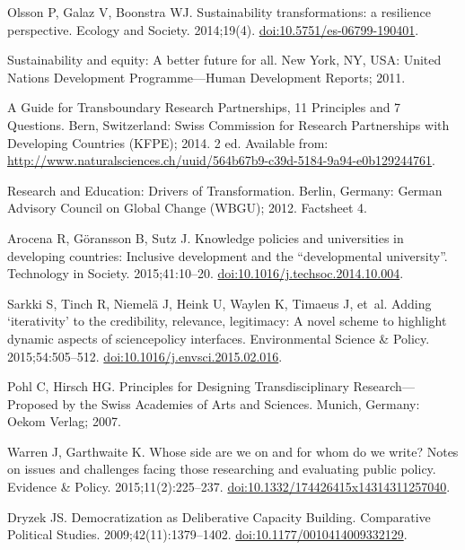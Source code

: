 \documentclass[10pt,a4paper]{article}
\begin{document}
\begin{multicols}{2}
\begin{footnotesize}
\begin{thebibliography}{10}
Olsson P, Galaz V, Boonstra WJ.
\newblock Sustainability transformations: a resilience perspective.
\newblock Ecology and Society. 2014;19(4).
\newblock
  \href{https://doi.org/10.5751/es-06799-190401}{doi:10.5751/es-06799-190401}.

Sustainability and equity: A better future for all.
\newblock New York, NY, USA: United Nations Development Programme---Human
  Development Reports; 2011.

A Guide for Transboundary Research Partnerships, 11 Principles and 7 Questions.
\newblock Bern, Switzerland: Swiss Commission for Research Partnerships with
  Developing Countries (KFPE); 2014. 2 ed.
\newblock Available from:
  \url{http://www.naturalsciences.ch/uuid/564b67b9-c39d-5184-9a94-e0b129244761}.

Research and Education: Drivers of Transformation.
\newblock Berlin, Germany: German Advisory Council on Global Change (WBGU);
  2012. Factsheet 4.

Arocena R, Göransson B, Sutz J.
\newblock Knowledge policies and universities in developing countries:
  Inclusive development and the {\textquotedblleft}developmental
  university{\textquotedblright}.
\newblock Technology in Society. 2015;41:10--20.
\newblock
  \href{https://doi.org/10.1016/j.techsoc.2014.10.004}{doi:10.1016/j.techsoc.2014.10.004}.

Sarkki S, Tinch R, Niemelä J, Heink U, Waylen K, Timaeus J, et~al.
\newblock Adding `iterativity' to the credibility, relevance, legitimacy: A
  novel scheme to highlight dynamic aspects of science{\textendash}policy
  interfaces.
\newblock Environmental Science {\&} Policy. 2015;54:505--512.
\newblock
  \href{https://doi.org/10.1016/j.envsci.2015.02.016}{doi:10.1016/j.envsci.2015.02.016}.

Pohl C, Hirsch HG.
\newblock Principles for Designing Transdisciplinary Research---Proposed by the
  Swiss Academies of Arts and Sciences.
\newblock Munich, Germany: Oekom Verlag; 2007.

Warren J, Garthwaite K.
\newblock Whose side are we on and for whom do we write? Notes on issues and
  challenges facing those researching and evaluating public policy.
\newblock Evidence \& Policy. 2015;11(2):225--237.
\newblock
  \href{https://doi.org/10.1332/174426415x14314311257040}{doi:10.1332/174426415x14314311257040}.

Dryzek JS.
\newblock Democratization as Deliberative Capacity Building.
\newblock Comparative Political Studies. 2009;42(11):1379--1402.
\newblock
  \href{https://doi.org/10.1177/0010414009332129}{doi:10.1177/0010414009332129}.


\end{thebibliography}
\end{footnotesize}
\end{multicols}
\end{document}
